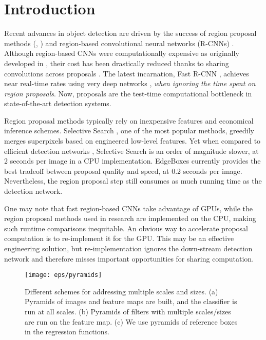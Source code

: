 \documentclass[10pt,journal,cspaper,compsoc]{IEEEtran}
\begin{document}
\maketitle



\IEEEpeerreviewmaketitle


\section{Introduction}

Recent advances in object detection are driven by the success of region proposal methods (\eg, \cite{Uijlings2013}) and region-based convolutional neural networks (R-CNNs) \cite{Girshick2014}. Although region-based CNNs were computationally expensive as originally developed in \cite{Girshick2014}, their cost has been drastically reduced thanks to sharing convolutions across proposals \cite{He2014,Girshick2015a}. The latest incarnation, Fast R-CNN \cite{Girshick2015a}, achieves near real-time rates using very deep networks \cite{Simonyan2015}, \emph{when ignoring the time spent on region proposals}. Now, proposals are the test-time computational bottleneck in state-of-the-art detection systems.

Region proposal methods typically rely on inexpensive features and economical inference schemes.
Selective Search \cite{Uijlings2013}, one of the most popular methods, greedily merges superpixels based on engineered low-level features. Yet when compared to efficient detection networks \cite{Girshick2015a}, Selective Search is an order of magnitude slower, at 2 seconds per image in a CPU implementation.
EdgeBoxes \cite{Zitnick2014} currently provides the best tradeoff between proposal quality and speed, at 0.2 seconds per image. Nevertheless, the region proposal step still consumes as much running time as the detection network.

One may note that fast region-based CNNs take advantage of GPUs, while the region proposal methods used in research are implemented on the CPU, making such runtime comparisons inequitable. An obvious way to accelerate proposal computation is to re-implement it for the GPU. This may be an effective engineering solution, but re-implementation ignores the down-stream detection network and therefore misses important opportunities for sharing computation.

\begin{figure*}[t]
\centering
\texttt{[image: eps/pyramids]}
\caption{Different schemes for addressing multiple scales and sizes. (a) Pyramids of images and feature maps are built, and the classifier is run at all scales. (b) Pyramids of filters with multiple scales/sizes are run on the feature map. (c) We use pyramids of reference boxes in the regression functions.}
\label{fig:pyramids}
\end{figure*}
\end{document}
